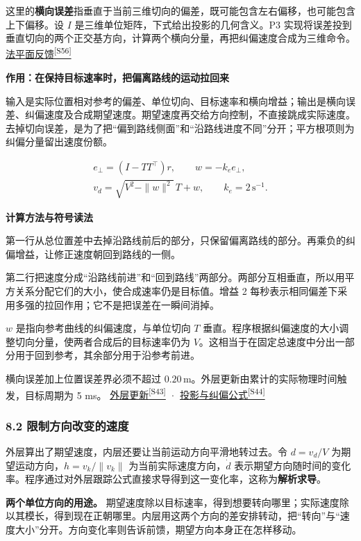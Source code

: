 \documentclass[12pt,a4paper]{article}
\numberwithin{equation}{topic}
\newcommand{\sourceref}[2]{\hyperlink{source-#1}{#2\textsuperscript{[#1]}}}
\begin{document}
这里的\textbf{横向误差}指垂直于当前三维切向的偏差，既可能包含左右偏移，也可能包含上下偏移。设 \(I\) 是三维单位矩阵，下式给出投影的几何含义。P3 实现将误差投到垂直切向的两个正交基方向，计算两个横向分量，再把纠偏速度合成为三维命令。\sourceref{S56}{法平面反馈}

\noindent\textbf{作用：在保持目标速率时，把偏离路线的运动拉回来}\par\nobreak
输入是实际位置相对参考的偏差、单位切向、目标速率和横向增益；输出是横向误差、纠偏速度及合成期望速度。期望速度再交给方向控制，不直接跳成实际速度。去掉切向误差，是为了把“偏到路线侧面”和“沿路线进度不同”分开；平方根项则为纠偏分量留出速度份额。

\begin{equation}
\label{eq:cross-track}
\begin{gathered}
e_\perp=(I-TT^\top)r,\qquad
w=-k_e e_\perp,\\
v_d=\sqrt{V^2-\|w\|^2}\,T+w,\qquad
k_e=2\,\mathrm{s^{-1}}.
\end{gathered}
\end{equation}

\noindent\textbf{计算方法与符号读法}\par\nobreak
第一行从总位置差中去掉沿路线前后的部分，只保留偏离路线的部分。再乘负的纠偏增益，让修正速度朝回到路线的一侧。

第二行把速度分成“沿路线前进”和“回到路线”两部分。两部分互相垂直，所以用平方关系分配它们的大小，使合成速率仍是目标值。增益 2 每秒表示相同偏差下采用多强的拉回作用；它不是把误差在一瞬间消掉。


\(w\) 是指向参考曲线的纠偏速度，与单位切向 \(T\) 垂直。程序根据纠偏速度的大小调整切向分量，使两者合成后的目标速率仍为 \(V\)。这相当于在固定总速度中分出一部分用于回到参考，其余部分用于沿参考前进。

横向误差加上位置误差界必须不超过 \(0.20\,\mathrm m\)。外层更新由累计的实际物理时间触发，目标周期为 5 ms。 \sourceref{S43}{外层更新} · \sourceref{S44}{投影与纠偏公式}

\subsubsection*{8.2 限制方向改变的速度}

外层算出了期望速度，内层还要让当前运动方向平滑地转过去。令 \(d=v_d/V\) 为期望运动方向，\(h=v_k/\|v_k\|\) 为当前实际速度方向，\(\dot d\) 表示期望方向随时间的变化率。程序通过对外层跟踪公式直接求导得到这一变化率，这称为\textbf{解析求导}。

\textbf{两个单位方向的用途。} 期望速度除以目标速率，得到想要转向哪里；实际速度除以其模长，得到现在正朝哪里。内层用这两个方向的差安排转动，把“转向”与“速度大小”分开。方向变化率则告诉前馈，期望方向本身正在怎样移动。
\end{document}
